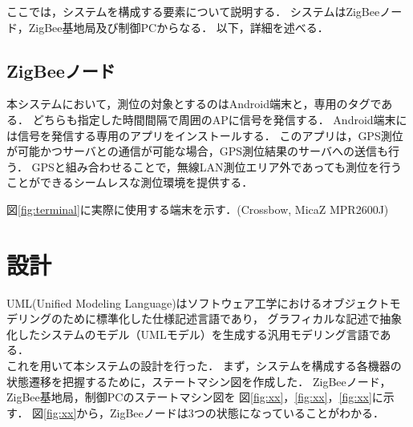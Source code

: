 \documentclass[12pt]{jreport}
\begin{document}
ここでは，システムを構成する要素について説明する．
システムはZigBeeノード，ZigBee基地局及び制御PCからなる．
以下，詳細を述べる．

\subsection{ZigBeeノード}

本システムにおいて，測位の対象とするのはAndroid端末と，専用のタグである．
どちらも指定した時間間隔で周囲のAPに信号を発信する．
Android端末には信号を発信する専用のアプリをインストールする．
このアプリは，GPS測位が可能かつサーバとの通信が可能な場合，GPS測位結果のサーバへの送信も行う．
GPSと組み合わせることで，無線LAN測位エリア外であっても測位を行うことができるシームレスな測位環境を提供する．

図\ref{fig:terminal}に実際に使用する端末を示す．(Crossbow, MicaZ MPR2600J)



\section{設計}
UML(Unified Modeling Language)はソフトウェア工学におけるオブジェクトモデリングのために標準化した仕様記述言語であり，
グラフィカルな記述で抽象化したシステムのモデル（UMLモデル）を生成する汎用モデリング言語である．\\
これを用いて本システムの設計を行った．
まず，システムを構成する各機器の状態遷移を把握するために，ステートマシン図を作成した．
ZigBeeノード，ZigBee基地局，制御PCのステートマシン図を
図\ref{fig:xx}，\ref{fig:xx}，\ref{fig:xx}に示す．
図\ref{fig:xx}から，ZigBeeノードは3つの状態になっていることがわかる．
\end{document}
